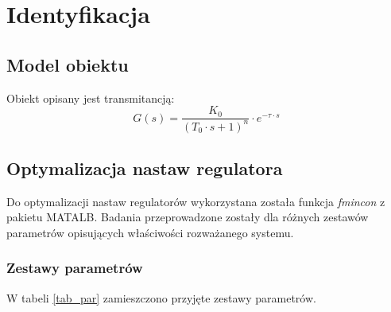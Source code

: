 \chapter{Identyfikacja}


\section{Model obiektu}

Obiekt opisany jest transmitancją:
\begin{equation}\label{key}
G(s) = \dfrac{K_0}{(T_0 \cdot s + 1)^n} \cdot e^{-\tau \cdot s} 
\end{equation} 
 
 
\section{Optymalizacja nastaw regulatora}

Do optymalizacji nastaw regulatorów wykorzystana została funkcja \textit{fmincon} z pakietu MATALB. Badania przeprowadzone zostały dla różnych zestawów parametrów opisujących właściwości rozważanego systemu.

\subsection{Zestawy parametrów}

W tabeli \ref{tab_par} zamieszczono przyjęte zestawy parametrów.

